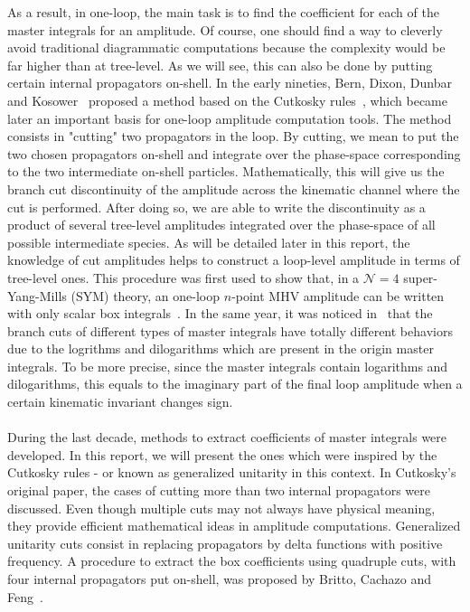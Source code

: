 As a result, in one-loop, the main task is to find the coefficient for each of the master integrals for an amplitude.
Of course, one should find a way to cleverly avoid traditional diagrammatic computations because the complexity would be far higher than at tree-level.
As we will see, this can also be done by putting certain internal propagators on-shell.
In the early nineties, Bern, Dixon, Dunbar and Kosower~\cite{Bern:1994zx} proposed a method based on the Cutkosky rules~\cite{doi:10.1063/1.1703676},  
which became later an important basis for one-loop amplitude computation tools.
The method consists in "cutting" two propagators in the loop.
By cutting, we mean to put the two chosen propagators on-shell and integrate over the phase-space corresponding to the two intermediate on-shell particles.
Mathematically, this will give us the branch cut discontinuity of the amplitude across the kinematic channel where the cut is performed. 
After doing so, we are able to write the discontinuity as a product of several tree-level amplitudes integrated over the phase-space of all possible intermediate species.
As will be detailed later in this report, the knowledge of cut amplitudes helps to construct a loop-level amplitude in terms of tree-level ones. 
This procedure was first used to show that, in a $\mathcal{N}=4$ super-Yang-Mills (SYM) theory, an one-loop $n$-point MHV amplitude can be written with only scalar box integrals~\cite{Bern:1994zx}.
In the same year, it was noticed in~\cite{Bern:1994cg} that the branch cuts of different types of master integrals have totally different behaviors due to the logrithms and dilogarithms which are present in the origin master integrals. 
To be more precise, since the master integrals contain logarithms and dilogarithms, this equals to the imaginary part of the final loop amplitude when a certain kinematic invariant changes sign.
\\\\
During the last decade, methods to extract coefficients of master integrals were developed.
In this report, we will present the ones which were inspired by the Cutkosky rules - or known as generalized unitarity in this context.
In Cutkosky's original paper, the cases of cutting more than two internal propagators were discussed.
Even though multiple cuts may not always have physical meaning, they provide efficient mathematical ideas in amplitude computations.
Generalized unitarity cuts consist in replacing propagators by delta functions with positive frequency.
A procedure to extract the box coefficients using quadruple cuts, \ie with four internal propagators put on-shell, was proposed by Britto, Cachazo and Feng~\cite{Britto:2004nc}. 
